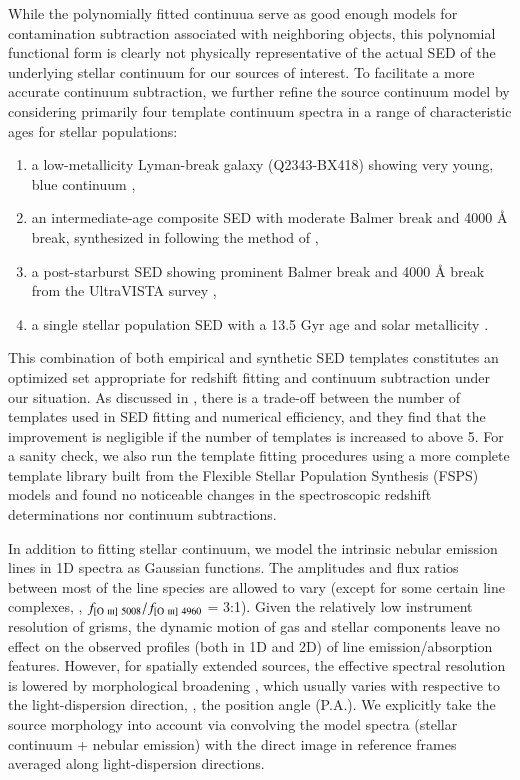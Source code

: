 While the polynomially fitted continuua serve as good enough models for contamination subtraction
associated with neighboring objects, this polynomial functional form is clearly not physically representative of
the actual SED of the underlying stellar continuum for our sources of interest.
To facilitate a more accurate continuum subtraction, we further refine the source continuum model by considering 
primarily four template continuum spectra in a range of characteristic ages for stellar populations:
\begin{enumerate}
    \item a low-metallicity Lyman-break galaxy (Q2343-BX418) showing very young, blue continuum 
    \citep{Erb:2010iy},
    \item an intermediate-age composite SED with moderate Balmer break and 4000 \AA{} break, synthesized in 
    \citet{Brammer:2008gn} following the method of \citet{KCorrectionsandFi:WJFCKqrW},
    \item a post-starburst SED showing prominent Balmer break and 4000 \AA{} break from the UltraVISTA survey 
    \citep{Muzzin:2013is},
    \item a single stellar population SED with a 13.5 Gyr age and solar metallicity \citep{Conroy:2012bl}.
\end{enumerate}
This combination of both empirical and synthetic SED templates constitutes an optimized set appropriate for 
redshift fitting and continuum subtraction under our situation.
As discussed in \citet{Brammer:2008gn}, there is a trade-off between the number of templates used in SED fitting 
and numerical efficiency, and they find that the improvement is negligible if the number of templates is 
increased to above 5.
For a sanity check, we also run the template fitting procedures using a more complete template library built from 
the Flexible Stellar Population Synthesis (FSPS) models \citep{Conroy:2009ks,Conroy:2010ja,Conroy:2010bi} and 
found no noticeable changes in the spectroscopic redshift determinations nor continuum subtractions.

In addition to fitting stellar continuum, we model the intrinsic nebular emission lines in 1D spectra as Gaussian
functions. The amplitudes and flux ratios between most of the line species are allowed to vary (except for some
certain line complexes, \eg, $f_{[\textrm{O}~\textsc{iii}]~5008}/f_{[\textrm{O}~\textsc{iii}]~4960}$ = 3:1).
Given the relatively low instrument resolution of \hst grisms, the dynamic motion of gas and stellar components 
leave no effect on the observed profiles (both in 1D and 2D) of line emission/absorption features.
However, for spatially extended sources, the effective spectral resolution is lowered by morphological broadening 
\citep{vanDokkum:2011cq}, which usually varies with respective to the light-dispersion direction, \ie, the 
position angle (P.A.).
We explicitly take the source morphology into account via convolving the model spectra (stellar continuum + 
nebular emission) with the direct image in reference frames averaged along light-dispersion directions.

